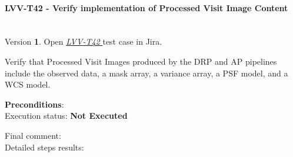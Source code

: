 \documentclass[DM,lsstdraft,STR,toc]{lsstdoc}
\begin{document}
\paragraph{ LVV-T42 - Verify implementation of Processed Visit Image Content }\mbox{}\\

Version \textbf{1}.
Open  \href{https://jira.lsstcorp.org/secure/Tests.jspa#/testCase/LVV-T42}{\textit{ LVV-T42 } }
test case in Jira.

Verify that Processed Visit Images produced by the DRP and AP pipelines
include the observed data, a mask array, a variance array, a PSF model,
and a WCS model.

\textbf{ Preconditions}:\\


Execution status: {\bf Not Executed }

Final comment:\\


Detailed steps results:
\end{document}
